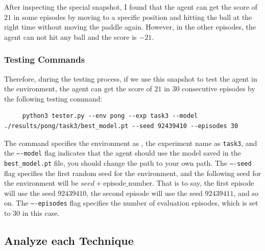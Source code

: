 After inspecting the special snapshot, I found that the agent can get the score of $21$ in some episodes by moving to a specific position and hitting the ball at the right time without moving the paddle again.
However, in the other episodes, the agent can not hit any ball and the score is $-21$.

\subsubsection{Testing Commands}

Therefore, during the testing process, if we use this snapshot to test the agent in the \pong environment, the agent can get the score of $21$ in 30 consecutive episodes by the following testing command:
\begin{verbatim}
     python3 tester.py --env pong --exp task3 --model ./results/pong/task3/best_model.pt --seed 92439410 --episodes 30
\end{verbatim}

The command specifies the environment as \pong, the experiment name as \texttt{task3}, and the \texttt{----model} flag indicates that the agent should use the model saved in the \texttt{best\_model.pt} file, you should change the path to your own path.
The \texttt{----seed} flag specifies the first random seed for the environment, and the following seed for the environment will be $seed + \text{episode\_number}$. That is to say, the first episode will use the seed $92439410$, the second episode will use the seed $92439411$, and so on.
The \texttt{----episodes} flag specifies the number of evaluation episodes, which is set to $30$ in this case.



\subsection{Analyze each Technique}
